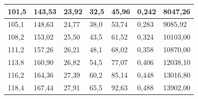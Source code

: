 \documentclass[a4paper,12pt]{article} %
\begin{document}
\begin{table}[h!]
\begin{tabular}{|l|l|l|l|l|l|l|}
		101,5                                     & 143,53                                                  & 23,92                                                 & 32,5                                     & 45,96                                                   & 0,242                        & 8047,26                                         \\ \hline
		105,1                                     & 148,63                                                  & 24,77                                                 & 38,0                                     & 53,74                                                   & 0,283                        & 9085,92                                         \\ \hline
		108,2                                     & 153,02                                                  & 25,50                                                 & 43,5                                     & 61,52                                                   & 0,324                        & 10103,00                                        \\ \hline
		111,2                                     & 157,26                                                  & 26,21                                                 & 48,1                                     & 68,02                                                   & 0,358                        & 10870,00                                        \\ \hline
		113,8                                     & 160,90                                                  & 26,82                                                 & 54,5                                     & 77,07                                                   & 0,406                        & 12038,10                                        \\ \hline
		116,2                                     & 164,36                                                  & 27,39                                                 & 60,2                                     & 85,14                                                   & 0,448                        & 13016,80                                        \\ \hline
		118,4                                     & 167,44                                                  & 27,91                                                 & 65,5                                     & 92,63                                                   & 0,488                        & 13902,00                                        \\ \hline

\end{tabular}
\end{table}
\end{document}
